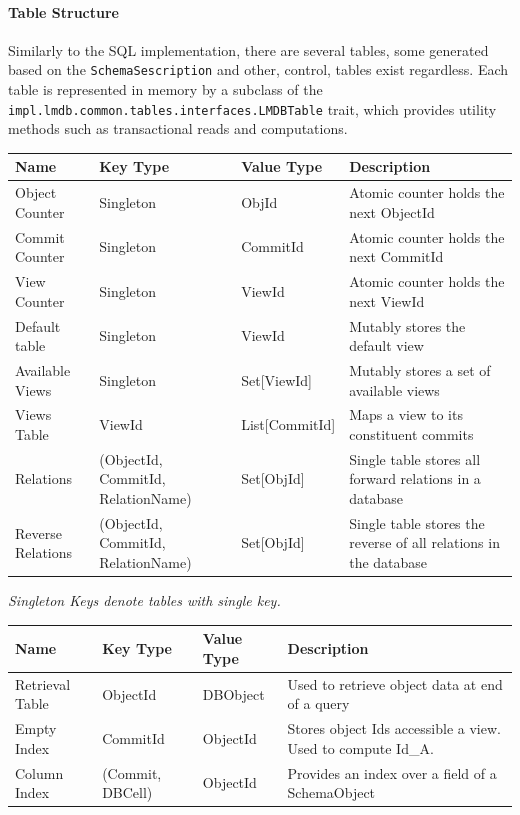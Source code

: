\documentclass[12pt,a4paper,twoside,openright]{report}
\newcommand\codeName[1]{\texttt{#1}}
\newcommand\note[1]{\textit{#1}}
\begin{document}
		\paragraph{Table Structure}
	
 Similarly to the SQL implementation, there are several tables, some generated based on the \codeName{SchemaSescription} and other, control, tables exist regardless. Each table is represented in memory by a subclass of the \codeName{impl.lmdb.common.tables.interfaces.LMDBTable} trait, which provides utility methods such as transactional reads and computations.
 
\begin{center}
	\begin{tabular}{ |p{3cm}||p{3cm}|p{3cm}||p{3cm}|}
 	\hline
 		
	Name & Key Type & Value Type  & Description \\ \hline
	Object Counter & Singleton & ObjId & Atomic counter holds the next ObjectId \\ \hline
	Commit Counter & Singleton & CommitId & Atomic counter holds the next CommitId \\ \hline
	View Counter & Singleton & ViewId & Atomic counter holds the next ViewId \\ \hline
	Default table & Singleton & ViewId & Mutably stores the default view \\ \hline
	Available Views & Singleton & Set[ViewId] & Mutably stores a set of available views \\ \hline
	Views Table & ViewId & List[CommitId] & Maps a view to its constituent commits \\ \hline
	Relations & (ObjectId, CommitId, RelationName) & Set[ObjId] & Single table stores all forward relations in a database \\ \hline
	Reverse Relations & (ObjectId, CommitId, RelationName) & Set[ObjId] & Single table stores the reverse of all relations in the database \\ \hline
	\end{tabular}
\end{center} 
 
 \note{Singleton Keys denote tables with single key.}
 \begin{center}
	\begin{tabular}{ |p{3cm}||p{3cm}|p{3cm}||p{3cm}|}
 	\hline
	Name & Key Type & Value Type  & Description \\ \hline
	Retrieval Table & ObjectId & DBObject & Used to retrieve object data at end of a query \\ \hline
	Empty Index & CommitId & ObjectId & Stores object Ids accessible a view. Used to compute Id_A. \\ \hline
	Column Index &  (Commit, DBCell) & ObjectId & Provides an index over a field of a SchemaObject \\ \hline
	\end{tabular}
\end{center}
\end{document}
